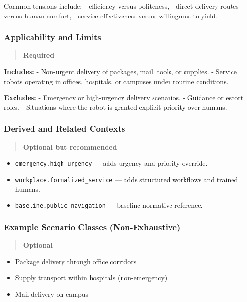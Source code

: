 \documentclass[utf8]{frontiers_suppmat} %
\providecommand{\tightlist}{%
  \setlength{\itemsep}{0pt}\setlength{\parskip}{0pt}}
\begin{document}
Common tensions include: - efficiency versus politeness, - direct
delivery routes versus human comfort, - service effectiveness versus
willingness to yield.

\subsubsection{Applicability and Limits}\label{applicability-and-limits}

\begin{quote}
\textbf{Required}
\end{quote}

\textbf{Includes:} - Non-urgent delivery of packages, mail, tools, or
supplies. - Service robots operating in offices, hospitals, or campuses
under routine conditions.

\textbf{Excludes:} - Emergency or high-urgency delivery scenarios. -
Guidance or escort roles. - Situations where the robot is granted
explicit priority over humans.

\subsubsection{Derived and Related
Contexts}\label{derived-and-related-contexts}

\begin{quote}
\textbf{Optional but recommended}
\end{quote}

\begin{itemize}
\tightlist
\item
  \texttt{emergency.high\_urgency} --- adds urgency and priority
  override.
\item
  \texttt{workplace.formalized\_service} --- adds structured workflows
  and trained humans.
\item
  \texttt{baseline.public\_navigation} --- baseline normative reference.
\end{itemize}

\subsubsection{Example Scenario Classes
(Non-Exhaustive)}\label{example-scenario-classes-non-exhaustive}

\begin{quote}
\textbf{Optional}
\end{quote}

\begin{itemize}
\tightlist
\item
  Package delivery through office corridors
\item
  Supply transport within hospitals (non-emergency)
\item
  Mail delivery on campus
\end{itemize}
\end{document}
